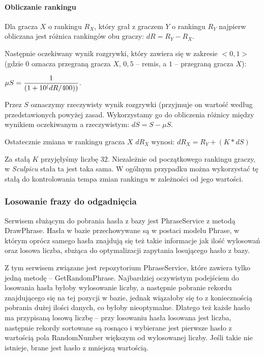 \paragraph{Obliczanie rankingu}
Dla gracza $X$ o rankingu $R_X$, który grał z graczem $Y$ o rankingu $R_Y$ najpierw obliczana jest różnica rankingów obu graczy:
$dR=R_Y-R_X$.

Następnie oczekiwany wynik rozgrywki, który zawiera się w zakresie $<0,1>$ (gdzie $0$ oznacza przegraną gracza $X$, $0,5$ – remis, a $1$ – przegraną gracza $X$):

\begin{center}
$\displaystyle{\mu S = {{1} \over {(1+10^(dR/400))}}}$.
\end{center}

Przez $S$ oznaczymy rzeczywisty wynik rozgrywki (przyjmuje on wartość według przedstawionych powyżej zasad. Wykorzystamy go do obliczenia różnicy między wynikiem oczekiwanym a rzeczywistym: $dS=S-\mu S$.

Ostatecznie zmiana w rankingu gracza $X$ $dR_X$ wynosi: $dR_X=R_Y+(K*dS)$

Za stałą $K$ przyjęłyśmy liczbę $32$. Niezależnie od początkowego rankingu graczy, w \textit{Sculpicu} stała ta jest taka sama. W ogólnym przypadku można wykorzystać tę stałą do kontrolowania tempa zmian rankingu w zależności od jego wartości.

\subsubsection{Losowanie frazy do odgadnięcia}
Serwisem służącym do pobrania hasła z bazy jest PhraseService z metodą DrawPhrase. Hasła w bazie przechowywane są w postaci modelu Phrase, w którym oprócz samego hasła znajdują się też takie informacje jak ilość wylosowań oraz losowa liczba, służąca do optymalizacji zapytania losującego hasło z bazy.

Z tym serwisem związane jest repozytorium PhraseService, które zawiera tylko jedną metodę – GetRandomPhrase. Najbardziej oczywistym podejściem do losowania hasła byłoby wylosowanie liczby, a następnie pobranie rekordu znajdującego się na tej pozycji w bazie, jednak wiązałoby się to z koniecznością pobrania dużej ilości danych, co byłoby nieoptymalne. Dlatego też każde hasło ma przypisaną losową liczbę – przy losowaniu hasła losowana jest liczba, następnie rekordy sortowane są rosnąco i wybierane jest pierwsze hasło z wartością pola RandomNumber większym od wylosowanej liczby. Jeśli takie nie istnieje, brane jest hasło z mniejszą wartością. 

